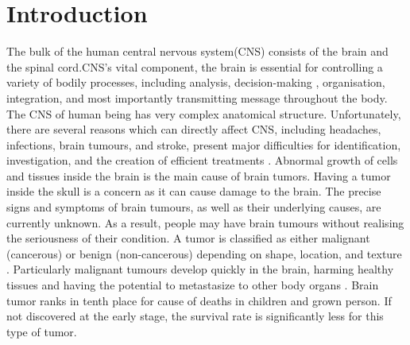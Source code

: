 \documentclass[12pt, a4paper,twoside]{report}
\theoremstyle{plain} %
\theoremstyle{definition} %
\theoremstyle{remark} %
\numberwithin{equation}{chapter}
\begin{document}
\clearpage


\tableofcontents

\listoffigures

\listoftables

\chapter{Introduction}\label{ch:1}
The bulk of the human central nervous system(CNS) consists of the brain and the spinal cord.CNS's vital component, the brain is essential for controlling a variety of bodily processes, including analysis, decision-making , organisation, integration, and most importantly transmitting message throughout the body. The CNS of human being has very complex anatomical structure. Unfortunately, there are several reasons which can directly affect CNS, including headaches, infections, brain tumours, and stroke, present major difficulties for identification, investigation, and the creation of efficient treatments \cite{arabahmadi22}. Abnormal growth of cells and tissues inside the brain is the main cause of brain tumors. Having a tumor inside the skull is a concern as it can cause damage to the brain. The precise signs and symptoms of brain tumours, as well as their underlying causes, are currently unknown. As a result, people may have brain tumours without realising the seriousness of their condition. A tumor is classified as either malignant (cancerous)  or benign (non-cancerous)  depending on shape, location, and texture \cite{mabray15}. Particularly malignant tumours develop quickly in the brain, harming healthy tissues and having the potential to metastasize to other body organs \cite{lakshmi22}. Brain tumor ranks in tenth place for cause of deaths in children and grown person\cite{iorgulescu22}. If not discovered at the early stage, the survival rate is significantly less for this type of tumor.
\end{document}
